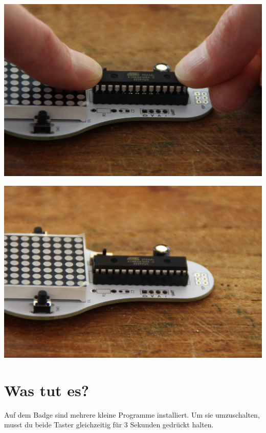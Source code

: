 \documentclass{article}
\begin{document}
\vspace{0.5cm}

\begin{minipage}[b]{0.5\textwidth}
	\includegraphics[width=\textwidth]{Bilder2023/IMG_8394.JPG}
\end{minipage}
\begin{minipage}[b]{0.5\textwidth}
	\includegraphics[width=\textwidth]{Bilder2023/IMG_8395.JPG}
\end{minipage}

\vspace{0.5cm}


\section{Was tut es?}

Auf dem Badge sind mehrere kleine Programme installiert. Um sie umzuschalten, musst du beide Taster gleichzeitig für 3 Sekunden gedrückt halten.\\
\end{document}
